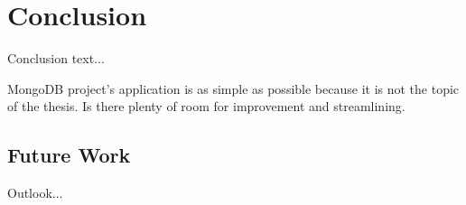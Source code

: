 \chapter{Conclusion} \label{chap:conclusion}
Conclusion text...

MongoDB project's application is as simple as possible because it is not the topic of the thesis. Is there plenty of room for improvement and streamlining.

\section{Future Work} \label{sec:future_work}
Outlook...